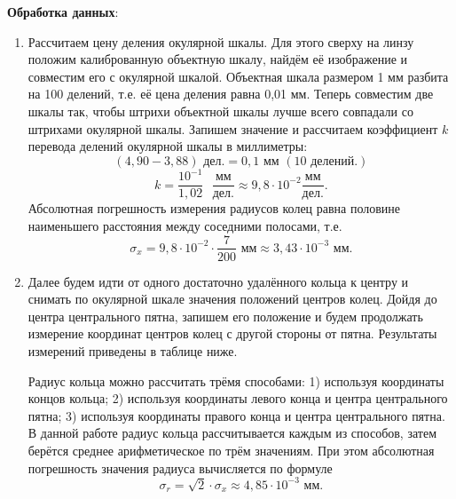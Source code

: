 \documentclass[a4paper,12pt]{article}
\begin{document}
\textbf{Обработка данных}:  
\begin{enumerate}
    \item Рассчитаем цену деления окулярной шкалы. Для этого сверху на линзу положим калиброванную объектную шкалу, найдём её изображение и совместим его с окулярной шкалой. Объектная шкала размером 1 мм разбита на 100 делений, т.е. её цена деления равна 0,01 мм. Теперь совместим две шкалы так, чтобы штрихи объектной шкалы лучше всего совпадали со штрихами окулярной шкалы. Запишем значение и рассчитаем коэффициент $k$ перевода делений окулярной шкалы в миллиметры:
    \[(4,90 - 3,88) \text{ дел.} = 0,1 \text{ мм } (\text{10 делений.})\]
    \[k = \frac{10^{-1}}{1,02} \text{ } \frac{мм}{дел.} \approx 9,8 \cdot 10^{-2} \frac{мм}{дел.}.\]
    Абсолютная погрешность измерения радиусов колец равна половине наименьшего расстояния между соседними полосами, т.е. 
    \[\sigma_x = 9,8 \cdot 10^{-2} \cdot \frac{7}{200} \text{ мм} \approx 3,43 \cdot 10^{-3} \text{ мм}.\]
    \item Далее будем идти от одного достаточно удалённого кольца к центру и снимать по окулярной шкале значения положений центров колец. Дойдя до центра центрального пятна, запишем его положение и будем продолжать измерение координат центров колец с другой стороны от пятна. Результаты измерений приведены в таблице ниже.

    Радиус кольца можно рассчитать трёмя способами:  1) используя координаты концов кольца; 2) используя координаты левого конца и центра центрального пятна; 3) используя координаты правого конца и центра центрального пятна. В данной работе радиус кольца рассчитывается каждым из способов, затем берётся среднее арифметическое по трём значениям. При этом абсолютная погрешность значения радиуса вычисляется по формуле
    \[\sigma_r = \sqrt{2} \cdot \sigma_x \approx 4,85 \cdot 10^{-3} \text{ мм.}\]


\end{enumerate}
\end{document}
